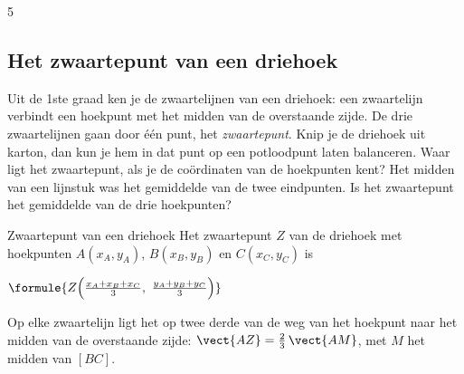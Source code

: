 \begin{alleenvoor}{5}
\subsection{Het zwaartepunt van een driehoek}

Uit de 1ste graad ken je de zwaartelijnen van een driehoek: een zwaartelijn verbindt een hoekpunt met het midden van de overstaande zijde. De drie zwaartelijnen gaan door één punt, het \textit{zwaartepunt}. Knip je de driehoek uit karton, dan kun je hem in dat punt op een potloodpunt laten balanceren. Waar ligt het zwaartepunt, als je de coördinaten van de hoekpunten kent? Het midden van een lijnstuk was het gemiddelde van de twee eindpunten. Is het zwaartepunt het gemiddelde van de drie hoekpunten?

\begin{theorie}
\begin{minipage}[t]{.6\linewidth}
\vspace{0pt}
\begin{stelling}{Zwaartepunt van een driehoek}
Het zwaartepunt $Z$ van de driehoek met hoekpunten $A(x_A, y_A)$, $B(x_B, y_B)$ en $C(x_C, y_C)$ is

\vspace{1mm}
\qquad $\formule{Z\Bigl(\frac{x_A + x_B + x_C}{3},\ \frac{y_A + y_B + y_C}{3}\Bigr)}$

\vspace{1mm}
Op elke zwaartelijn ligt het op twee derde van de weg van het hoekpunt naar het midden van de overstaande zijde: $\vect{AZ} = \tfrac23\,\vect{AM}$, met $M$ het midden van $[BC]$.
\end{stelling}
\end{minipage}\hfill
\begin{minipage}[t]{.36\linewidth}
\vspace{1mm}
\centering
{}
\end{minipage}
\end{theorie}


\end{alleenvoor}
